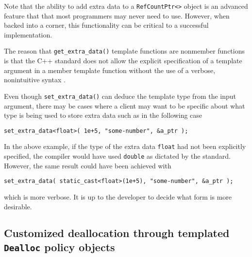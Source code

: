 Note that the ability to add extra data to a
{}\texttt{Ref\-Count\-Ptr<>} object is an advanced feature that that
most programmers may never need to use.  However, when backed into a
corner, this functionality can be critical to a successful
implementation.

The reason that {}\texttt{get\-\_extra\-\_data()} template functions
are nonmember functions is that the C++ standard does not allow the
explicit specification of a template argument in a member template
function without the use of a verbose, nonintuitive syntax
{}\cite[C.13.6]{ref:stroustrup_2000}.

Even though {}\texttt{set\-\_extra\-\_data()} can deduce the template
type from the input argument, there may be cases where a client may
want to be specific about what type is being used to store extra data
such as in the following case

{\scriptsize\begin{verbatim}
set_extra_data<float>( 1e+5, "some-number", &a_ptr );
\end{verbatim}}

{}\noindent{}In the above example, if the type of the extra data
{}\texttt{float} had not been explicitly specified, the compiler would
have used {}\texttt{double} as dictated by the standard.  However, the
same result could have been achieved with

{\scriptsize\begin{verbatim}
set_extra_data( static_cast<float>(1e+5), "some-number", &a_ptr );
\end{verbatim}}

{}\noindent{}which is more verbose.  It is up to the developer to
decide what form is more desirable.

%
\subsection{Customized deallocation through templated {}\texttt{Dealloc} policy objects}
\label{rcp:sec:dealloc}
%

